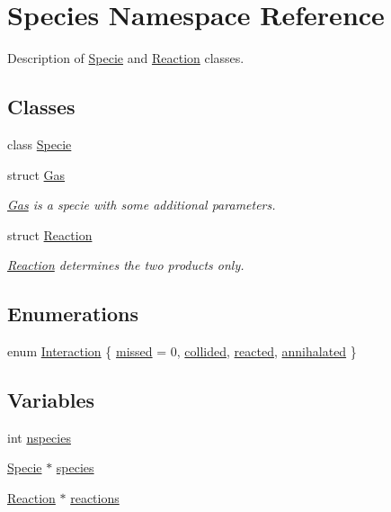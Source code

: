 \hypertarget{namespaceSpecies}{
\section{Species Namespace Reference}
\label{namespaceSpecies}
}
Description of \hyperlink{classSpecies_1_1Specie}{Specie} and \hyperlink{structSpecies_1_1Reaction}{Reaction} classes.  


\subsection*{Classes}
\begin{CompactItemize}
\item 
class \hyperlink{classSpecies_1_1Specie}{Specie}
\item 
struct \hyperlink{structSpecies_1_1Gas}{Gas}
\begin{CompactList}\small\item\em \hyperlink{structSpecies_1_1Gas}{Gas} is a specie with some additional parameters. \item\end{CompactList}\item 
struct \hyperlink{structSpecies_1_1Reaction}{Reaction}
\begin{CompactList}\small\item\em \hyperlink{structSpecies_1_1Reaction}{Reaction} determines the two products only. \item\end{CompactList}\end{CompactItemize}
\subsection*{Enumerations}
\begin{CompactItemize}
\item 
enum \hyperlink{namespaceSpecies_aa897d386b20b57b719a044b5bb30a83}{Interaction} \{ \hyperlink{namespaceSpecies_aa897d386b20b57b719a044b5bb30a8342bcabda00198979743ea42e32c522b1}{missed} = 0, 
\hyperlink{namespaceSpecies_aa897d386b20b57b719a044b5bb30a839c7a9e713300cb3b94c377519fbdf10d}{collided}, 
\hyperlink{namespaceSpecies_aa897d386b20b57b719a044b5bb30a83491eee3c39e7857ff7fa635f42fe9b63}{reacted}, 
\hyperlink{namespaceSpecies_aa897d386b20b57b719a044b5bb30a83990b6073e485754c526763e07c59a031}{annihalated}
 \}
\end{CompactItemize}
\subsection*{Variables}
\begin{CompactItemize}
\item 
int \hyperlink{namespaceSpecies_ae2c14c915d4e318d3f91c7c923703c2}{nspecies}
\item 
\hyperlink{classSpecies_1_1Specie}{Specie} $\ast$ \hyperlink{namespaceSpecies_fd6fa7c938aa29a1b23b04e0aaed469f}{species}
\item 
\hyperlink{structSpecies_1_1Reaction}{Reaction} $\ast$ \hyperlink{namespaceSpecies_e880334166f7d3eb95e744b0d895d483}{reactions}
\end{CompactItemize}


